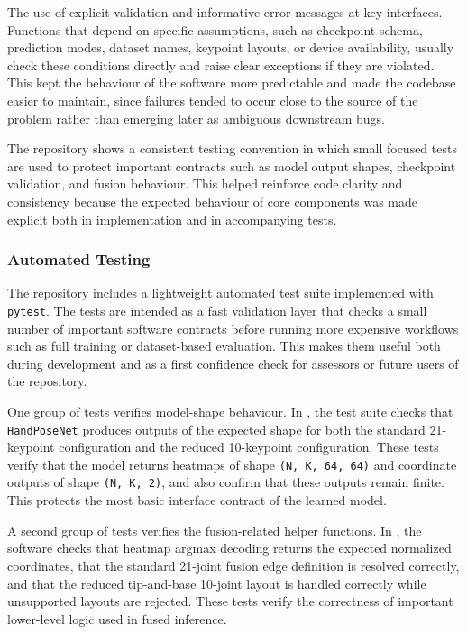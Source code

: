 ﻿\documentclass[11pt,a4paper]{article}
\begin{document}
The use of explicit validation and informative error 
messages at key interfaces. Functions that depend on specific
assumptions, such as checkpoint schema, prediction modes, dataset names,
keypoint layouts, or device availability, usually check these conditions
directly and raise clear exceptions if they are violated.
This kept the behaviour of the software more predictable and made the codebase
easier to maintain, since failures tended to occur close to the source of the
problem rather than emerging later as ambiguous downstream bugs.

\medskip

The repository shows a consistent testing convention in which small
focused tests are used to protect important contracts such as model output
shapes, checkpoint validation, and fusion behaviour.
This helped reinforce code clarity and consistency because the expected
behaviour of core components was made explicit both in implementation and in
accompanying tests.

\subsubsection{Automated Testing}

The repository includes a lightweight automated test suite implemented with
\texttt{pytest}. The tests are intended as a fast validation layer that checks
a small number of important software contracts before running more expensive
workflows such as full training or dataset-based evaluation.
This makes them useful both during development and as a first confidence check
for assessors or future users of the repository.

\medskip

One group of tests verifies model-shape behaviour. In
, the test suite checks that
\texttt{HandPoseNet} produces outputs of the expected shape for both the
standard 21-keypoint configuration and the reduced 10-keypoint configuration.
These tests verify that the model returns heatmaps of shape \texttt{(N, K, 64,
64)} and coordinate outputs of shape \texttt{(N, K, 2)}, and also confirm
that these outputs remain finite. This protects the most basic interface
contract of the learned model.

\medskip

A second group of tests verifies the fusion-related helper functions. In
, the software checks that heatmap argmax
decoding returns the expected normalized coordinates, that the standard
21-joint fusion edge definition is resolved correctly, and that the reduced
tip-and-base 10-joint layout is handled correctly while unsupported layouts
are rejected.
These tests verify the correctness of important lower-level logic used in
fused inference.
\end{document}

